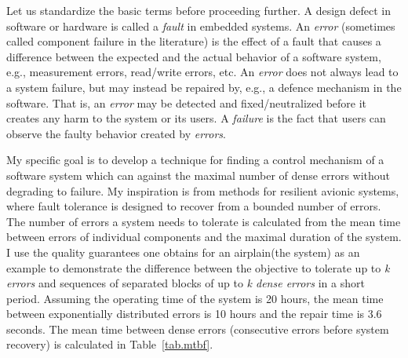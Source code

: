 Let us standardize the basic terms before proceeding further.
A design defect in software or hardware is called a {\it fault} in embedded systems.
An {\it error} (sometimes called component failure in the literature) is the effect of a fault that causes a difference between the expected and the actual behavior of a software system, e.g., measurement errors, read/write errors, etc. 
An {\it error} does not always lead to a system failure, but may instead be repaired by, e.g., a defence mechanism in the software. 
That is, an {\it error} may be detected and fixed/neutralized before it creates any harm to the system or its users.
A {\it failure} is the fact that users can observe the faulty behavior created by {\it errors}.

My specific goal is to develop a technique for finding a control mechanism of a software system which can against the maximal number of dense errors without degrading to failure.
My inspiration is from methods for resilient avionic systems\cite{conf/ftrtft/1992}, where fault tolerance is designed to recover from a bounded number of errors.
The number of errors a system needs to tolerate is calculated from the mean time between errors of individual components and the maximal duration of the system.
I use the quality guarantees one obtains for an airplain(the system) as an example to demonstrate the difference between the objective to tolerate up to {\it k errors} and sequences of separated blocks of up to {\it k dense errors} in a short period.
Assuming the operating time of the system is 20 hours, the mean time between exponentially distributed errors is 10 hours and the repair time is 3.6 seconds.
The mean time between dense errors (consecutive errors before system recovery) is calculated in Table~\ref{tab.mtbf}.

\begin{table*}
\begin{center}
\end{center}
\caption{Probabilities of $k$ dense errors} 
\label{tab.ntbe} 
\end{table*}
%
%

